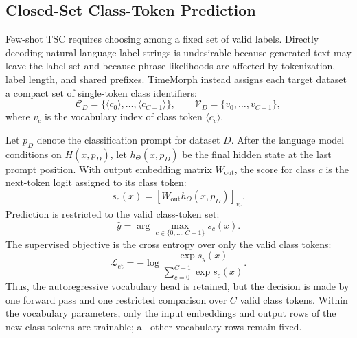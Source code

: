 \documentclass{article}
\begin{document}
\subsection{Closed-Set Class-Token Prediction}
\label{sec:class-token-classification}

Few-shot TSC requires choosing among a fixed set of valid labels. Directly
decoding natural-language label strings is undesirable because generated text may
leave the label set and because phrase likelihoods are affected by tokenization,
label length, and shared prefixes. TimeMorph instead assigns each target dataset
a compact set of single-token class identifiers:
\begin{equation}
\label{eq:class-token-set}
\mathcal{C}_D
=
\{
\langle c_0\rangle,\ldots,\langle c_{C-1}\rangle
\},
\qquad
\mathcal{V}_D
=
\{
v_0,\ldots,v_{C-1}
\},
\end{equation}
where $v_c$ is the vocabulary index of class token $\langle c_c\rangle$.

Let $p_D$ denote the classification prompt for dataset $D$. After the language
model conditions on $H(x,p_D)$, let $h_{\Theta}(x,p_D)$ be the final hidden state
at the last prompt position. With output embedding matrix $W_{\mathrm{out}}$, the
score for class $c$ is the next-token logit assigned to its class token:
\begin{equation}
\label{eq:class-score}
s_c(x)
=
\left[
W_{\mathrm{out}}h_{\Theta}(x,p_D)
\right]_{v_c}.
\end{equation}
Prediction is restricted to the valid class-token set:
\begin{equation}
\label{eq:class-pred}
\hat{y}
=
\arg\max_{c\in\{0,\ldots,C-1\}} s_c(x).
\end{equation}
The supervised objective is the cross entropy over only the valid class tokens:
\begin{equation}
\label{eq:class-token-loss}
\mathcal{L}_{\mathrm{ct}}
=
-\log
\frac{\exp s_y(x)}
{\sum_{c=0}^{C-1}\exp s_c(x)}.
\end{equation}
Thus, the autoregressive vocabulary head is retained, but the decision is made by
one forward pass and one restricted comparison over $C$ valid class tokens.
Within the vocabulary parameters, only the input embeddings and output rows of
the new class tokens are trainable; all other vocabulary rows remain fixed.
\end{document}
